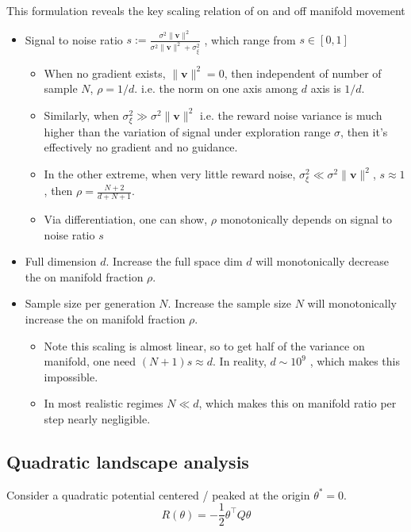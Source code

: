     This formulation reveals the key scaling relation of on and off manifold
    movement 
    \begin{itemize}
    \item Signal to noise ratio $s:=\frac{\sigma^{2}\|\mathbf{v}\|^{2}}{\sigma^{2}\|\mathbf{v}\|^{2}+\sigma_{\xi}^{2}}$
    , which range from $s\in[0,1]$
    \begin{itemize}
    \item When no gradient exists, $\|\mathbf{v}\|^{2}=0$, then independent
    of number of sample $N$, $\rho=1/d$. i.e. the norm on one axis among
    $d$ axis is $1/d$.
    \item Similarly, when $\sigma_{\xi}^{2}\gg\sigma^{2}\|\mathbf{v}\|^{2}$
    i.e. the reward noise variance is much higher than the variation of
    signal under exploration range $\sigma$, then it's effectively no
    gradient and no guidance. 
    \item In the other extreme, when very little reward noise, $\sigma_{\xi}^{2}\ll\sigma^{2}\|\mathbf{v}\|^{2}$,
    $s\approx1$, then $\rho=\frac{N+2}{d+N+1}$. 
    \item Via differentiation, one can show, $\rho$ monotonically depends on
    signal to noise ratio $s$
    \end{itemize}
    \item Full dimension $d$. Increase the full space dim $d$ will monotonically
    decrease the on manifold fraction $\rho$. 
    \item Sample size per generation $N$. Increase the sample size $N$ will
    monotonically increase the on manifold fraction $\rho$. 
    \begin{itemize}
    \item Note this scaling is almost linear, so to get half of the variance
    on manifold, one need $(N+1)s\approx d$. In reality, $d\sim10^{9}$
    , which makes this impossible. 
    \item In most realistic regimes $N\ll d$, which makes this on manifold
    ratio per step nearly negligible. 
    \end{itemize}
    \end{itemize}
    
    \clearpage
    \subsection{Quadratic landscape analysis} \label{appsec:quad_landscape_step}
    
    Consider a quadratic potential centered / peaked at the origin $\theta^{*}=0$.
    \[
    R(\theta)=-\frac{1}{2}\theta^{\top}Q\theta
    \]
    
